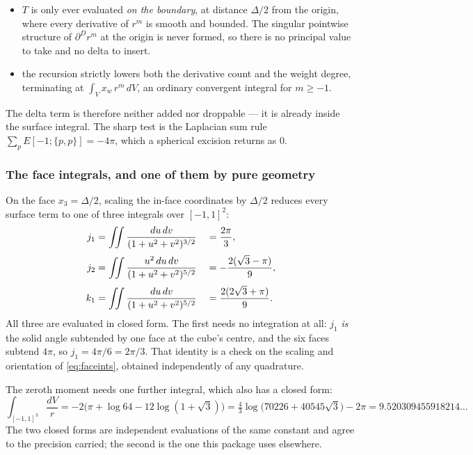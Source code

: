 \documentclass[11pt,a4paper]{article}
\begin{document}
\begin{itemize}
\item $T$ is only ever evaluated \emph{on the boundary}, at distance $\Delta/2$
      from the origin, where every derivative of $r^m$ is smooth and bounded.
      The singular pointwise structure of $\partial^Dr^m$ at the origin is never
      formed, so there is no principal value to take and no delta to insert.
\item the recursion strictly lowers both the derivative count and the weight
      degree, terminating at $\int_V x_w\,r^m\,dV$, an ordinary convergent
      integral for $m\ge-1$.
\end{itemize}

The delta term is therefore neither added nor droppable --- it is already inside
the surface integral.  The sharp test is the Laplacian sum rule
$\sum_p E[-1;\{p,p\}] = -4\pi$, which a spherical excision returns as $0$.

\subsubsection{The face integrals, and one of them by pure geometry}

On the face $x_3 = \Delta/2$, scaling the in-face coordinates by $\Delta/2$
reduces every surface term to one of three integrals over $[-1,1]^2$:
\begin{align}\label{eq:faceints}
  j_1 &= \iint\frac{du\,dv}{(1+u^2+v^2)^{3/2}}
       &&= \frac{2\pi}{3}, \notag\\[2pt]
  j_2 &= \iint\frac{u^2\,du\,dv}{(1+u^2+v^2)^{5/2}}
       &&= -\frac{2(\sqrt3-\pi)}{9}, \\[2pt]
  k_1 &= \iint\frac{du\,dv}{(1+u^2+v^2)^{5/2}}
       &&= \frac{2(2\sqrt3+\pi)}{9}. \notag
\end{align}
All three are evaluated in closed form.  The first needs no integration at all:
$j_1$ \emph{is} the solid angle subtended by one face at the cube's centre, and
the six faces subtend $4\pi$, so $j_1 = 4\pi/6 = 2\pi/3$.  That identity is a
check on the scaling and orientation of \eqref{eq:faceints}, obtained
independently of any quadrature.

The zeroth moment needs one further integral, which also has a closed form:
\begin{equation}\label{eq:ivr}
  \int_{[-1,1]^3}\frac{dV}{r}
  = -2\bigl(\pi + \log 64 - 12\log(1+\sqrt3)\bigr)
  = \tfrac43\log\bigl(70226 + 40545\sqrt3\bigr) - 2\pi
  = 9.520309455918214\ldots
\end{equation}
The two closed forms are independent evaluations of the same constant and agree
to the precision carried; the second is the one this package uses elsewhere.
\end{document}
